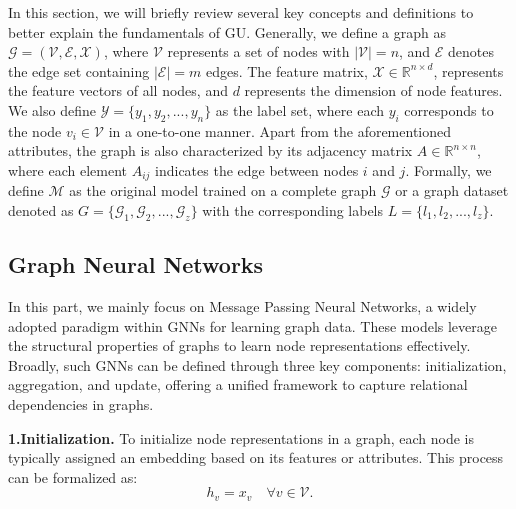 
In this section, we will briefly review several key concepts and definitions to better explain the fundamentals of GU. Generally, we define a graph as $\mathcal{G}=(\mathcal{V},\mathcal{E},\mathcal{X})$, where $\mathcal{V}$ represents a set of nodes with $\lvert \mathcal{V} \rvert=n$, and $\mathcal{E}$ denotes the edge set containing $\lvert \mathcal{E} \rvert = m$ edges. The feature matrix, $\mathcal{X} \in\mathbb{R}^{n\times d}$, represents the feature vectors of all nodes, and $d$ represents the dimension of node features. We also define $\mathcal{Y} = \{y_1,y_2,...,y_n\}$ as the label set, where each $y_i$ corresponds to the node $v_i \in \mathcal{V}$ in a one-to-one manner. Apart from the aforementioned attributes, the graph is also characterized by its adjacency matrix $A \in \mathbb{R}^{n\times n}$, where each element $A_{ij}$ indicates the edge between nodes $i$ and $j$. Formally, we define $\mathcal{M}$ as the original model trained on a complete graph $\mathcal{G}$ or a graph dataset denoted as $G = \{\mathcal{G}_1,\mathcal{G}_2,...,\mathcal{G}_z\}$ with the corresponding labels $L = \{l_1,l_2,...,l_z\}$.

\subsection{Graph Neural Networks}
In this part, we mainly focus on Message Passing Neural Networks, a widely adopted paradigm within GNNs for learning graph data. These models leverage the structural properties of graphs to learn node representations effectively. Broadly, such GNNs can be defined through three key components: initialization, aggregation, and update, offering a unified framework to capture relational dependencies in graphs.


\noindent\textbf{1.Initialization.}
To initialize node representations in a graph, each node is typically assigned an embedding based on its features or attributes. This process can be formalized as:
\begin{equation}
h_v = x_v\quad\forall v \in \mathcal{V}.
\end{equation}

